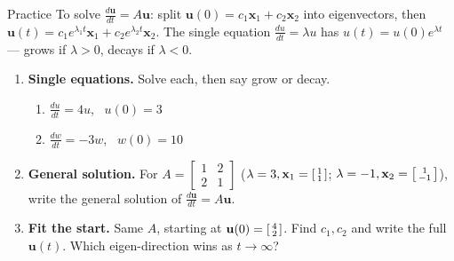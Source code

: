 \documentclass[10pt]{article}
\newcommand{\uu}{\mathbf{u}}
\newcommand{\xx}{\mathbf{x}}
\begin{document}
\namedateperiod

\vspace{0.12in}

\begin{notesbox}{Practice}
To solve $\frac{d\uu}{dt}=A\uu$: split $\uu(0)=c_1\xx_1+c_2\xx_2$ into eigenvectors, then
$\uu(t)=c_1e^{\lambda_1 t}\xx_1+c_2e^{\lambda_2 t}\xx_2$. The single equation $\frac{du}{dt}=\lambda u$ has
$u(t)=u(0)e^{\lambda t}$ --- grows if $\lambda>0$, decays if $\lambda<0$.

\begin{enumerate}[leftmargin=1.9em, itemsep=12pt]
  \item \textbf{Single equations.} Solve each, then say grow or decay.
    \begin{enumerate}[label=(\alph*), leftmargin=1.8em, itemsep=4pt]
      \item $\frac{du}{dt}=4u$, \ $u(0)=3$ \hfill {}
      \item $\frac{dw}{dt}=-3w$, \ $w(0)=10$ \hfill {}
    \end{enumerate}
  \item \textbf{General solution.} For $A=\begin{bmatrix} 1 & 2 \\ 2 & 1 \end{bmatrix}$
        ($\lambda=3,\xx_1=\begin{bsmallmatrix}1\\1\end{bsmallmatrix}$; $\lambda=-1,\xx_2=\begin{bsmallmatrix}1\\-1\end{bsmallmatrix}$),
        write the general solution of $\frac{d\uu}{dt}=A\uu$.
        \ansline{$\uu(t)=c_1e^{3t}\begin{bsmallmatrix}1\\1\end{bsmallmatrix}+c_2e^{-t}\begin{bsmallmatrix}1\\-1\end{bsmallmatrix}$.}
  \item \textbf{Fit the start.} Same $A$, starting at $\uu(0)=\begin{bsmallmatrix}4\\2\end{bsmallmatrix}$. Find
        $c_1,c_2$ and write the full $\uu(t)$. Which eigen-direction wins as $t\to\infty$?

\end{enumerate}
\end{notesbox}
\end{document}
